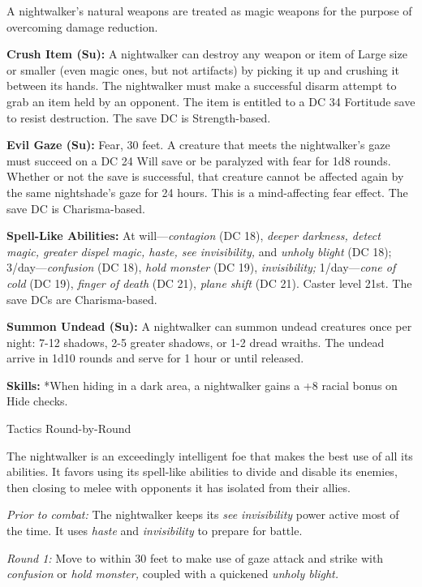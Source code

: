\documentclass{article}
\begin{document}
A nightwalker's natural weapons are treated as magic weapons for the purpose of 
overcoming damage reduction.

\textbf{Crush Item (Su):} A nightwalker can destroy any weapon or item of Large 
size or smaller (even magic ones, but not artifacts) by picking it up and crushing 
it between its hands. The nightwalker must make a successful disarm attempt to 
grab an item held by an opponent. The item is entitled to a DC 34 Fortitude save 
to resist destruction. The save DC is Strength-based. 

\textbf{Evil Gaze (Su):} Fear, 30 feet. A creature that meets the nightwalker's 
gaze must succeed on a DC 24 Will save or be paralyzed with fear for 1d8 rounds. 
Whether or not the save is successful, that creature cannot be affected again by 
the same nightshade's gaze for 24 hours. This is a mind-affecting fear effect. 
The save DC is Charisma-based.

\textbf{Spell-Like Abilities:} At will---\textit{contagion }(DC 18), \textit{deeper 
darkness, detect magic, greater dispel magic, haste, see invisibility, }and \textit{unholy 
blight }(DC 18); 3/day---\textit{confusion }(DC 18), \textit{hold monster }(DC 
19), \textit{invisibility; }1/day---\textit{cone of cold }(DC 19), \textit{finger 
of death }(DC 21), \textit{plane shift }(DC 21). Caster level 21st. The save DCs 
are Charisma-based.

\textbf{Summon Undead (Su):} A nightwalker can summon undead creatures once per 
night: 7-12 shadows, 2-5 greater shadows, or 1-2 dread wraiths. The undead arrive 
in 1d10 rounds and serve for 1 hour or until released.

\textbf{Skills:} *When hiding in a dark area, a nightwalker gains a +8 racial bonus 
on Hide checks.

Tactics Round-by-Round

The nightwalker is an exceedingly intelligent foe that makes the best use of all 
its abilities. It favors using its spell-like abilities to divide and disable its 
enemies, then closing to melee with opponents it has isolated from their allies.

\textit{Prior to combat: }The nightwalker keeps its \textit{see invisibility }power 
active most of the time. It uses \textit{haste }and \textit{invisibility }to prepare 
for battle.

\textit{Round 1: }Move to within 30 feet to make use of gaze attack and strike 
with \textit{confusion }or \textit{hold monster, }coupled with a quickened \textit{unholy 
blight.}
\end{document}
